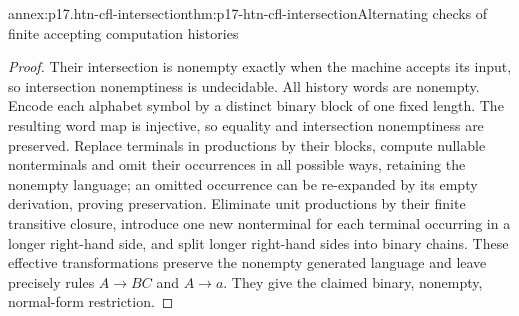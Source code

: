 \begin{annexitem}{annex:p17.htn-cfl-intersection}{thm:p17-htn-cfl-intersection}{Alternating checks of finite accepting computation histories}
\begin{proof}
Their intersection is nonempty exactly when the machine accepts its input,
so intersection nonemptiness is undecidable. All history words are nonempty.
Encode each alphabet symbol by a distinct binary block of one fixed length.
The resulting word map is injective, so equality and intersection
nonemptiness are preserved. Replace terminals in productions by their
blocks, compute nullable nonterminals and omit their occurrences in all
possible ways, retaining the nonempty language; an omitted occurrence
can be re-expanded by its empty derivation, proving preservation.
Eliminate unit productions by their finite transitive closure, introduce
one new nonterminal for each terminal occurring in a longer right-hand
side, and split longer right-hand sides into binary chains. These
effective transformations preserve the nonempty generated language and
leave precisely rules \(A\to BC\) and \(A\to a\). They give the
claimed binary, nonempty, normal-form restriction.
\end{proof}
\end{annexitem}

